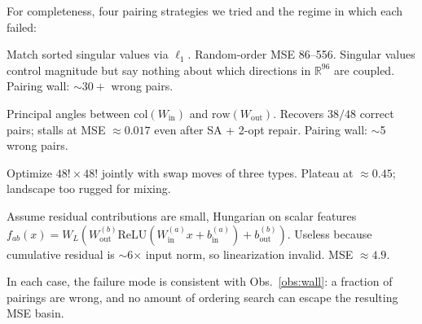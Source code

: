 \documentclass[10pt]{article}
\theoremstyle{remark}
\begin{document}
For completeness, four pairing strategies we tried and the regime in
which each failed:

\begin{description}[leftmargin=*]
  \item[SV-L1 spectrum.] Match sorted singular values via $\ell_1$.
        Random-order MSE 86--556. Singular values control magnitude
        but say nothing about which directions in $\mathbb{R}^{96}$
        are coupled. Pairing wall: $\sim 30+$ wrong pairs.
  \item[Subspace overlap.] Principal angles between
        $\mathrm{col}(W_{\mathrm{in}})$ and $\mathrm{row}(W_{\mathrm{out}})$.
        Recovers $38/48$ correct pairs; stalls at MSE $\approx 0.017$
        even after SA + 2-opt repair. Pairing wall: $\sim$5 wrong pairs.
  \item[Joint SA over (pairing, ordering).] Optimize $48!\times 48!$
        jointly with swap moves of three types. Plateau at
        $\approx 0.45$; landscape too rugged for mixing.
  \item[First-order algebraic.] Assume residual contributions are
        small, Hungarian on scalar features
        $f_{ab}(x) = W_L (W_{\mathrm{out}}^{(b)} \mathrm{ReLU}(W_{\mathrm{in}}^{(a)} x + b_{\mathrm{in}}^{(a)}) + b_{\mathrm{out}}^{(b)})$.
        Useless because cumulative residual is $\sim$6$\times$ input
        norm, so linearization invalid. MSE $\approx 4.9$.
\end{description}

In each case, the failure mode is consistent with Obs.~\ref{obs:wall}:
a fraction of pairings are wrong, and no amount of ordering search can
escape the resulting MSE basin.
\end{document}
